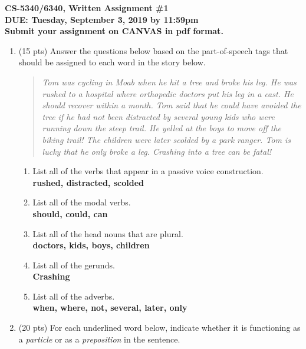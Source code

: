 \documentclass[11pt]{article}
\begin{document}
\large
\begin{center}
{\bf CS-5340/6340, Written Assignment \#1} \\
{\bf DUE: Tuesday, September 3, 2019 by 11:59pm} \\
{\bf  Submit your assignment on CANVAS in pdf format.}
\end{center}
\normalsize

\begin{enumerate}  

\item (15 pts) Answer the questions below based on the part-of-speech
  tags that should be assigned to each word in the story below.

  \begin{quote}
    {\it Tom was cycling in Moab when he hit a tree and broke his
      leg. He was rushed to a hospital where orthopedic doctors put
      his leg in a cast. He should recover within a month. Tom said
      that he could have avoided the tree if he had not been
      distracted by several young kids who were running down the steep
      trail. He yelled at the boys to move off the biking trail! The
      children were later scolded by a park ranger.  Tom is lucky that
      he only broke a leg. Crashing into a tree can be fatal!}
\end{quote}
  
  \begin{enumerate}

  \item List all of the verbs that  appear in a passive voice
    construction. \\
  \textbf{rushed, distracted, scolded} 
  \item List all of the modal verbs.\\
   \textbf{should, could, can}
  \item List all of the  head nouns that are plural. \\
 \textbf{doctors, kids, boys, children}
  \item List all of the gerunds. \\
 \textbf{Crashing}
  \item List all of the adverbs. \\
 \textbf{when, where, not, several, later, only}    
\end{enumerate}



\item (20 pts) For each underlined word below, indicate whether it is
  functioning as a {\it particle} or  as a {\it preposition} in the   sentence.


\end{enumerate}
\end{document}
